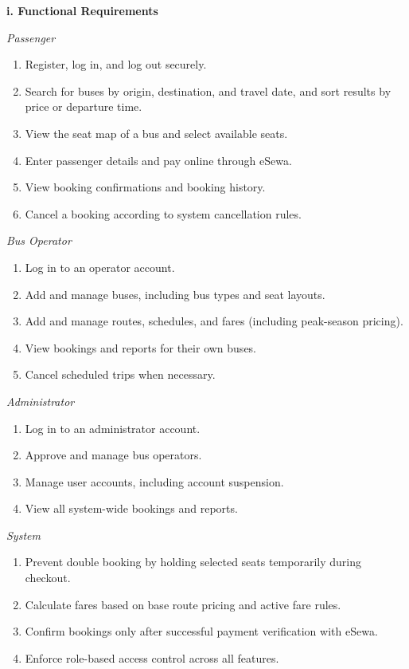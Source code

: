\textbf{i. Functional Requirements}

\textit{Passenger}
\begin{enumerate}
	\item Register, log in, and log out securely.
	\item Search for buses by origin, destination, and travel date, and sort results by price or departure time.
	\item View the seat map of a bus and select available seats.
	\item Enter passenger details and pay online through eSewa.
	\item View booking confirmations and booking history.
	\item Cancel a booking according to system cancellation rules.
\end{enumerate}

\textit{Bus Operator}
\begin{enumerate}
	\item Log in to an operator account.
	\item Add and manage buses, including bus types and seat layouts.
	\item Add and manage routes, schedules, and fares (including peak-season pricing).
	\item View bookings and reports for their own buses.
	\item Cancel scheduled trips when necessary.
\end{enumerate}

\textit{Administrator}
\begin{enumerate}
	\item Log in to an administrator account.
	\item Approve and manage bus operators.
	\item Manage user accounts, including account suspension.
	\item View all system-wide bookings and reports.
\end{enumerate}

\textit{System}
\begin{enumerate}
	\item Prevent double booking by holding selected seats temporarily during checkout.
	\item Calculate fares based on base route pricing and active fare rules.
	\item Confirm bookings only after successful payment verification with eSewa.
	\item Enforce role-based access control across all features.
\end{enumerate}

